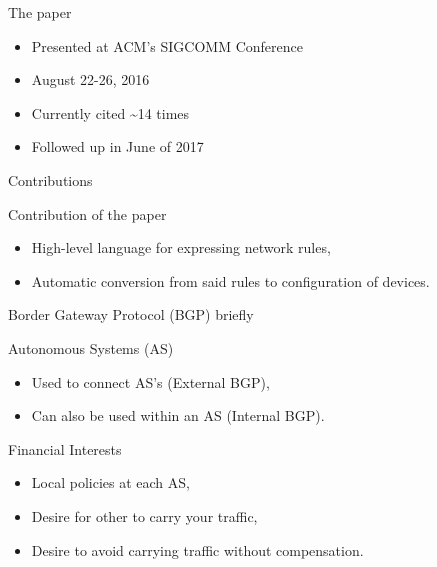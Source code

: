 \begin{frame}{The paper}
    \begin{block}{}
        \begin{itemize}
            \item Presented at ACM's SIGCOMM Conference
            \item August 22-26, 2016
            \item Currently cited \~{}14 times
            \item Followed up in June of 2017
        \end{itemize}
    \end{block}
\end{frame}

\begin{frame}{Contributions}
    \begin{block}{Contribution of the paper}
        \begin{itemize}
            \item High-level language for expressing \textcolor{ReneOrange}{network rules},
            \item \textcolor{ReneOrange}{Automatic conversion} from said rules to configuration of devices.
        \end{itemize}
    \end{block}
\end{frame}

\begin{frame}{Border Gateway Protocol (BGP) briefly}
    \begin{block}{Autonomous Systems (AS)}
        \begin{itemize}
            \item Used to connect AS's (External BGP),
            \item Can also be used within an AS (Internal BGP).
        \end{itemize}
    \end{block}
    \begin{block}{Financial Interests}
        \begin{itemize}
            \item Local policies at each AS,
            \item Desire for other to carry your traffic,
            \item Desire to avoid carrying traffic without compensation.
        \end{itemize}
    \end{block}
\end{frame}

